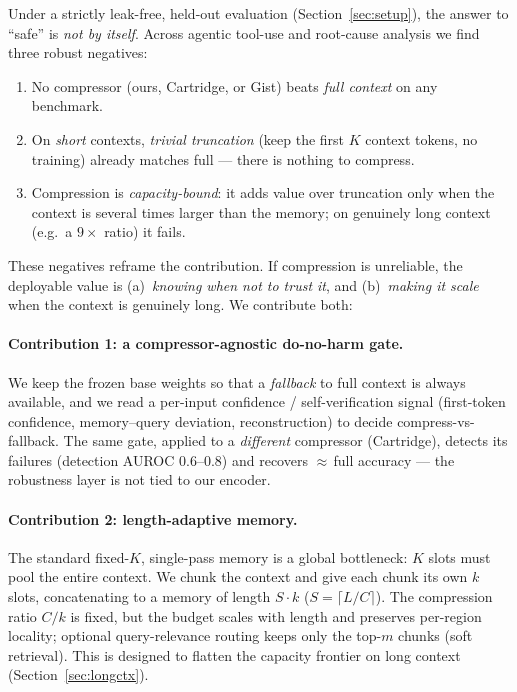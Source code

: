 \documentclass[11pt]{article}
\begin{document}
Under a strictly leak-free, held-out evaluation (Section~\ref{sec:setup}), the answer to ``safe'' is
\emph{not by itself}. Across agentic tool-use and root-cause analysis we find three robust negatives:
\begin{enumerate}[noitemsep]
  \item No compressor (ours, Cartridge, or Gist) beats \emph{full context} on any benchmark.
  \item On \emph{short} contexts, \emph{trivial truncation} (keep the first $K$ context tokens, no training)
        already matches full --- there is nothing to compress.
  \item Compression is \emph{capacity-bound}: it adds value over truncation only when the context is several
        times larger than the memory; on genuinely long context (e.g.\ a $9\times$ ratio) it fails.
\end{enumerate}
These negatives reframe the contribution. If compression is unreliable, the deployable value is (a)~\emph{knowing
when not to trust it}, and (b)~\emph{making it scale} when the context is genuinely long. We contribute both:

\paragraph{Contribution 1: a compressor-agnostic do-no-harm gate.}
We keep the frozen base weights so that a \emph{fallback} to full context is always available, and we read a
per-input confidence / self-verification signal (first-token confidence, memory--query deviation,
reconstruction) to decide compress-vs-fallback. The same gate, applied to a \emph{different} compressor
(Cartridge), detects its failures (detection AUROC $0.6$--$0.8$) and recovers $\approx$\,full accuracy --- the
robustness layer is not tied to our encoder.

\paragraph{Contribution 2: length-adaptive memory.}
The standard fixed-$K$, single-pass memory is a global bottleneck: $K$ slots must pool the entire context. We
chunk the context and give each chunk its own $k$ slots, concatenating to a memory of length $S\cdot k$
($S=\lceil L/C\rceil$). The compression ratio $C/k$ is fixed, but the budget scales with length and preserves
per-region locality; optional query-relevance routing keeps only the top-$m$ chunks (soft retrieval). This is
designed to flatten the capacity frontier on long context (Section~\ref{sec:longctx}).
\end{document}
